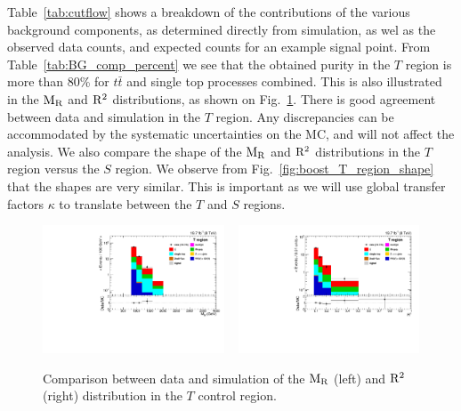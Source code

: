 Table~\ref{tab:cutflow} shows a breakdown of the contributions of the various background components,
as determined directly from simulation, as wel as the observed data counts, and expected counts for
an example signal point. From Table~\ref{tab:BG_comp_percent} we see that the obtained purity in the
$T$ region is more than 80\% for $t\bar{t}$ and single top processes combined. This is also
illustrated in the $\mathrm{M_R}$ and $\mathrm{R^2}$ distributions, as shown on Fig.~\ref{fig:boost_T_region_MR_Rsq}.
There is good agreement between data and simulation in the $T$ region. Any discrepancies can
be accommodated by the systematic uncertainties on the MC, and will not affect the analysis.
We also compare the shape of the $\mathrm{M_R}$ and $\mathrm{R^2}$ distributions in the $T$ region versus the $S$
region. We observe from Fig.~\ref{fig:boost_T_region_shape} that the shapes are very similar. This
is important as we will use global transfer factors $\kappa$ to translate between the $T$ and $S$
regions. 


\begin{figure}[htbp]
\centering
\includegraphics[width=0.48\textwidth]
{figures/razor_selection/plots/DataMC_MR_g1Mbg1W1LlmT100_mdPhig0p5_width}
~
\includegraphics[width=0.48\textwidth]
{figures/razor_selection/plots/DataMC_R2_g1Mbg1W1LlmT100_mdPhig0p5_width}
\caption{Comparison between data and simulation of the $\mathrm{M_R}$ (left) and $\mathrm{R^2}$ (right)
distribution in the $T$ control region. 
\label{fig:boost_T_region_MR_Rsq}}
\end{figure}

